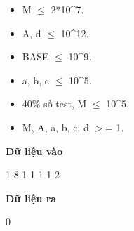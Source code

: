 \begin{itemize}
	\item     M  $\le$  2*10^7.   
	\item     A, d  $\le$  10^12.   
	\item     BASE  $\le$  10^9.   
	\item     a, b, c  $\le$  10^5.   
	\item     40\% số test, M  $\le$  10^5.   
	\item     M, A, a, b, c, d $>$= 1.   
\end{itemize}
\textbf{    Dữ liệu vào   }

   1 8 1 1 1 1 2  

\textbf{    Dữ liệu ra   }

   0